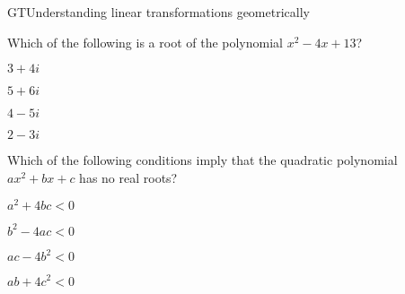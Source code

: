 \documentclass{article}
\begin{document}
\begin{module}{GT}{Understanding linear transformations geometrically}
\begin{readinessAssuranceTest}
\item Which of the following is a root of the polynomial $x^2-4x+13$?
\begin{multicols}{4}
\begin{readinessAssuranceTestChoices}
\item $3+4i$
\item $5+6i$
\item $4-5i$
\item $2-3i$ %
\end{readinessAssuranceTestChoices}
\end{multicols}

\item Which of the following conditions imply that the quadratic polynomial $ax^2+bx+c$ has no real roots?
\begin{multicols}{2}
\begin{readinessAssuranceTestChoices}
\item $a^2+4bc<0$
\item $b^2-4ac<0$ %
\item $ac-4b^2<0$
\item $ab+4c^2<0$
\end{readinessAssuranceTestChoices}
\end{multicols}


\end{readinessAssuranceTest}
\end{module}
\end{document}

